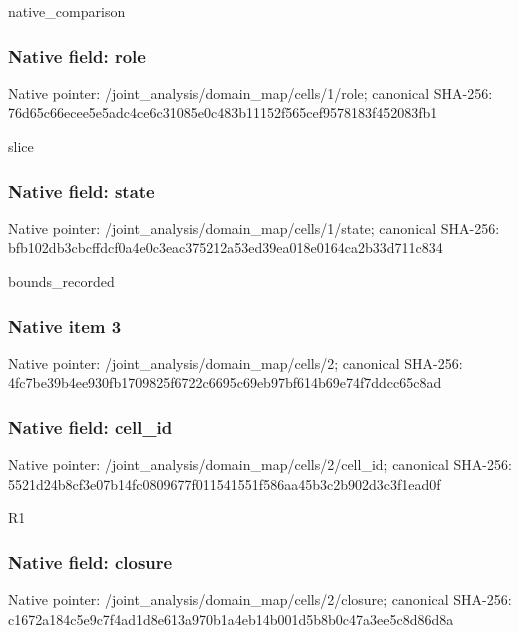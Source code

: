 \documentclass[10pt,a4paper]{article}
\begin{document}
\begingroup\raggedright\sloppy native\_\allowbreak{}comparison\par\endgroup

\subsubsection{Native field: role}
Native pointer: /joint\_\allowbreak{}analysis/domain\_\allowbreak{}map/cells/1/role; canonical SHA-256: 76d65c66ecee5e5adc4ce6c31085e0c483b11152f565cef9578183f452083fb1

\begingroup\raggedright\sloppy slice\par\endgroup

\subsubsection{Native field: state}
Native pointer: /joint\_\allowbreak{}analysis/domain\_\allowbreak{}map/cells/1/state; canonical SHA-256: bfb102db3cbcffdcf0a4e0c3eac375212a53ed39ea018e0164ca2b33d711c834

\begingroup\raggedright\sloppy bounds\_\allowbreak{}recorded\par\endgroup

\subsubsection{Native item 3}
Native pointer: /joint\_\allowbreak{}analysis/domain\_\allowbreak{}map/cells/2; canonical SHA-256: 4fc7be39b4ee930fb1709825f6722c6695c69eb97bf614b69e74f7ddcc65c8ad

\subsubsection{Native field: cell\_\allowbreak{}id}
Native pointer: /joint\_\allowbreak{}analysis/domain\_\allowbreak{}map/cells/2/cell\_\allowbreak{}id; canonical SHA-256: 5521d24b8cf3e07b14fc0809677f011541551f586aa45b3c2b902d3c3f1ead0f

\begingroup\raggedright\sloppy R1\par\endgroup

\subsubsection{Native field: closure}
Native pointer: /joint\_\allowbreak{}analysis/domain\_\allowbreak{}map/cells/2/closure; canonical SHA-256: c1672a184c5e9c7f4ad1d8e613a970b1a4eb14b001d5b8b0c47a3ee5c8d86d8a
\end{document}
